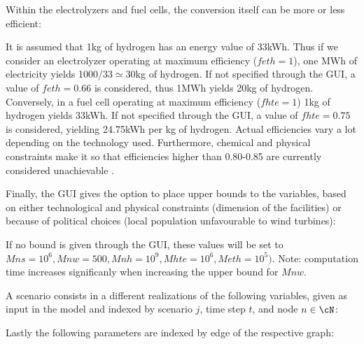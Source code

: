 Within the electrolyzers and fuel cells, the conversion itself can be more or less efficient:

It is assumed that 1kg of hydrogen has an energy value of 33kWh. Thus if we consider an electrolyzer operating at maximum efficiency ($feth=1$), one MWh of electricity yields 1000/33$\simeq$30kg of hydrogen. If not specified through the GUI, a value of $feth=0.66$ is considered, thus 1MWh yields 20kg of hydrogen.
Conversely, in a fuel cell operating at maximum efficiency ($fhte=1$) 1kg of hydrogen yields 
33kWh. If not specified through the GUI, a value of $fhte=0.75$ is considered, yielding 24.75kWh 
per kg of hydrogen. Actual efficiencies vary a lot depending on the technology used. Furthermore, chemical
 and physical constraints make it so that efficiencies higher than 0.80-0.85 are currently considered 
 unachievable \cite{DAWOOD}.

Finally, the GUI gives the option to place upper bounds to the variables, based on either technological and physical constraints (dimension of the facilities) or because of political choices (local population unfavourable to wind turbines): 

If no bound is given through the GUI, these values will be set to $Mns=10^6, Mnw=500, Mnh=10^9, Mhte=10^6, Meth=10^5)$. Note: computation time increases significanly when increasing the upper bound for $Mnw$.

A scenario consists in a different realizations of the following variables, given as input in the model and  indexed by scenario \(j\), time step \(t\), and node \(n \in \cN\):

Lastly the following parameters are indexed by edge of the respective graph:

\color{black}


